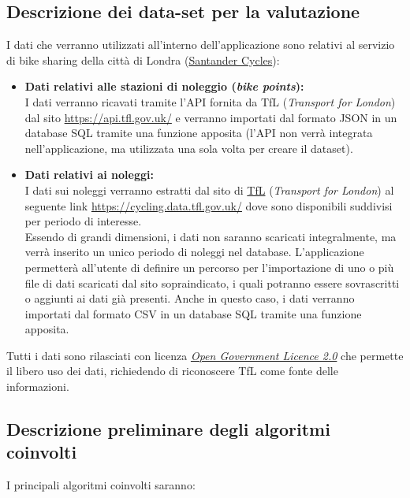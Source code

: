 \documentclass[a4paper, 12pt]{article}
\begin{document}
	\subsection{Descrizione dei data-set per la valutazione}
	I dati che verranno utilizzati all'interno dell'applicazione sono relativi al servizio di bike sharing della città di Londra (\href{https://www.santandercycles.co.uk/london}{Santander Cycles}):

	\begin{itemize}
	\item \textbf{Dati relativi alle stazioni di noleggio (\textit{bike points}):}\\
	I dati verranno ricavati tramite l'API fornita da TfL (\textit{Transport for London}) dal sito \url{https://api.tfl.gov.uk/} e verranno importati dal formato JSON in un database SQL tramite una funzione apposita (l'API non verrà integrata nell'applicazione, ma utilizzata una sola volta per creare il dataset).

	\item \textbf{Dati relativi ai noleggi:}\\
	I dati sui noleggi verranno estratti dal sito di \href{https://tfl.gov.uk/}{TfL} (\textit{Transport for London}) al seguente link \url{https://cycling.data.tfl.gov.uk/} dove sono disponibili suddivisi per periodo di interesse.\\
Essendo di grandi dimensioni, i dati non saranno scaricati integralmente, ma verrà inserito un unico periodo di noleggi nel database.
L'applicazione permetterà all'utente di definire un percorso per l'importazione di uno o più file di dati scaricati dal sito sopraindicato, i quali potranno essere sovrascritti o aggiunti ai dati già presenti. Anche in questo caso, i dati verranno importati dal formato CSV in un database SQL tramite una funzione apposita.
	\end{itemize}
Tutti i dati sono rilasciati con licenza \textit{\href{https://tfl.gov.uk/corporate/terms-and-conditions/transport-data-service}{Open Government Licence 2.0}} che permette il libero uso dei dati, richiedendo di riconoscere TfL come fonte delle informazioni.

	\subsection{Descrizione preliminare degli algoritmi coinvolti}
	I principali algoritmi coinvolti saranno:\\
\end{document}
